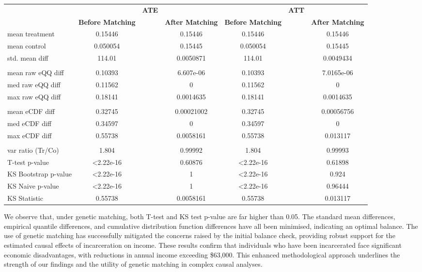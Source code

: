 \documentclass{article}[12pt]
\begin{document}
\begin{adjustbox}{width=1\textwidth}
    \centering
    \label{tab: Balance Check - Genetic Matching}
    \begin{tabular}{lcccccc}
        \toprule
         & & \textbf{ATE} & & & \textbf{ATT} & \\
         & \textbf{Before Matching} & & \textbf{After Matching} &\textbf{Before Matching} & & \textbf{After Matching} \\ 
        \midrule
         mean treatment & 0.15446 & & 0.15446 & 0.15446 & &  0.15446  \\
         mean control & 0.050054 & & 0.15445 & 0.050054 & & 0.15445  \\
         std. mean diff & 114.01 & & 0.0050871 & 114.01 & & 0.0049434 \\
         \\
         mean raw eQQ diff & 0.10393 & & 6.607e-06 & 0.10393 & & 7.0165e-06  \\
         med raw eQQ diff & 0.11562 & & 0 & 0.11562 & & 0\\
         max raw eQQ diff & 0.18141 & & 0.0014635 & 0.18141 & & 0.0014635 \\
         \\
         mean eCDF diff & 0.32745 & & 0.00021002 & 0.32745 & & 0.00056756 \\
         med eCDF diff & 0.34597 & & 0 & 0.34597 & & 0 \\
         max eCDF diff & 0.55738 & & 0.0058161 & 0.55738 & &  0.013117 \\
         \\
         var ratio (Tr/Co) & 1.804 & & 0.99992 & 1.804 & & 0.99993 \\
         T-test p-value & \textless 2.22e-16 & & 0.60876 & \textless 2.22e-16 & & 0.61898 \\
         KS Bootstrap p-value & \textless 2.22e-16 & & 1 & \textless 2.22e-16 & & 0.924 \\
         KS Naive p-value & \textless 2.22e-16 & & 1 & \textless 2.22e-16 & & 0.96444 \\
         KS Statistic & 0.55738 & & 0.0058161 & 0.55738 & & 0.013117 \\        
        \toprule
    \end{tabular}
\end{adjustbox}
\par

We observe that, under genetic matching, both T-test and KS test p-value are far higher than 0.05. The standard mean differences, empirical quantile differences, and cumulative distribution function differences have all been minimised, indicating an optimal balance. The use of genetic matching has successfully mitigated the concerns raised by the initial balance check, providing robust support for the estimated causal effects of incarceration on income. These results confirm that individuals who have been incarcerated face significant economic disadvantages, with reductions in annual income exceeding \$63,000. This enhanced methodological approach underlines the strength of our findings and the utility of genetic matching in complex causal analyses. \par
\end{document}
